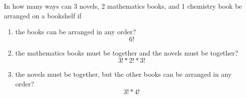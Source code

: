 \item In how many ways can 3 novels, 2 mathematics books, and 1 chemistry book be arranged on a bookshelf if
\begin{enumerate}
    \item the books can be arranged in any order?
    \[ 6! \]
    \item the mathematics books must be together and the novels must be together?
    \[ 3! * 2! * 3! \]
    \item the novels must be together, but the other books can be arranged in any order?
    \[ 3! * 4! \]
\end{enumerate}